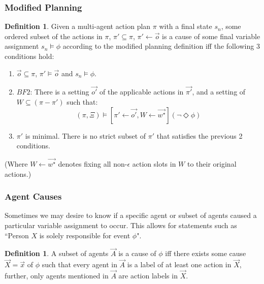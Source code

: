 \documentclass{article}
\theoremstyle{plain}
\theoremstyle{definition}
\newtheorem{defn}[thm]{Definition} %
\begin{document}
\subsubsection*{Modified Planning}
\begin{defn}
Given a multi-agent action plan $\pi$ with a final state $s_n$, some ordered subset of the actions in $\pi$, $\pi' \subseteq \pi$, $\pi' \leftarrow \vec{o}$ is a cause of some final variable assignment $s_n \models \phi$ according to the modified planning definition iff the following 3 conditions hold:
\begin{enumerate}
\item  $\vec{o} \subseteq \pi$, $\pi' \models \vec{o}$ and $s_n \models \phi$.
\item $BF2$: There is a setting $\vec{o'}$ of the applicable actions in $\vec{\pi'}$, and a setting of $W \subseteq (\pi  - \pi')$ such that:
\[
(\pi, \Xi) \models [\pi' \leftarrow \vec{o'}, W \leftarrow \vec{w^\star}](\lnot \Diamond \phi)
\]
\item $\pi'$ is minimal. There is no strict subset of $\pi'$ that satisfies the previous 2 conditions.
\end{enumerate}


(Where $W\leftarrow \vec{w^\star}$ denotes fixing all non-$\epsilon$ action slots in $W$ to their original actions.)

\end{defn}

\subsubsection*{Agent Causes}
Sometimes we may desire to know if a specific agent or subset of agents caused a particular variable assignment to occur. This allows for statements such as ``Person $X$ is solely responsible for event $\phi$".
\begin{defn}
A subset of agents $\vec{A}$ is a cause of $\phi$ iff there exists some cause $\vec{X}=\vec{x}$ of $\phi$ such that every agent in $\vec{A}$ is a label of at least one action in $\vec{X}$, further, only agents mentioned in $\vec{A}$ are action labels in $\vec{X}$.
\end{defn}
\end{document}
